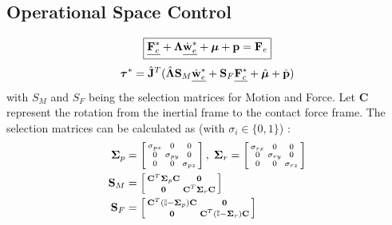 \documentclass[a4paper, 8pt]{extarticle}
\begin{document}
\begin{multicols*}{3}
\subsection*{Operational Space Control}
$$\boxed{
\underline{{\bf F}_c^*} + \bm\Lambda \underline{\dot{\bf w}_{e}^*} + \bm\mu + {\bf p} = {\bf F}_e }$$
$$
\bm\tau^* = \hat{\bf J}^T(\hat{\bm\Lambda} {\bf S}_M \underline{\dot{\bf w}_e^*} + {\bf S}_F \underline{{\bf F}_c^*} + \hat{\bm\mu} + \hat{\bf p})
$$\newline
with $S_{M}$ and $S_{F}$ being the selection matrices for Motion and Force. Let {\bf C} represent the rotation from the inertial frame to the contact force frame. The selection matrices can be calculated as (with $\sigma_{i} \in \{0,1\}$) :
\begin{align*}
\bm\Sigma_p &= \left[\begin{smallmatrix}
\sigma_{px} & 0 & 0 \\
0 & \sigma_{py} & 0 \\
0 & 0 & \sigma_{pz} \end{smallmatrix}\right], \;
\bm\Sigma_r = \left[\begin{smallmatrix}
\sigma_{rx} & 0 & 0 \\
0 & \sigma_{ry} & 0 \\
0 & 0 & \sigma_{rz} \end{smallmatrix}\right] \\
{\bf S}_M &= \left[\begin{smallmatrix}
{\bf C}^T\bm\Sigma_p{\bf C} & {\bf 0} \\
{\bf 0}  &  {\bf C}^T\bm\Sigma_r{\bf C}
\end{smallmatrix}\right]\\
{\bf S}_F &= \left[\begin{smallmatrix}
{\bf C}^T(\mathbb I - \bm\Sigma_p) {\bf C} & {\bf 0} \\
{\bf 0}  &  {\bf C}^T(\mathbb I - \bm\Sigma_r) {\bf C}
\end{smallmatrix}\right]
\end{align*}


\end{multicols*}
\end{document}
